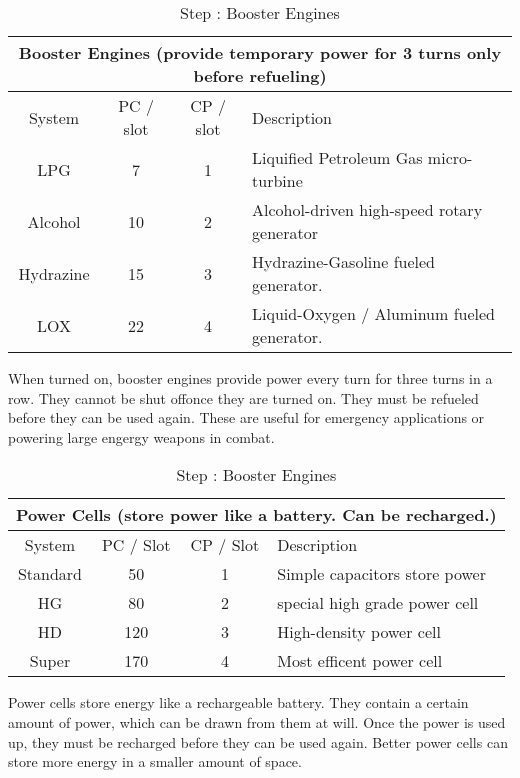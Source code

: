 \begin{table}[htb]
\begin{center}
\begin{tabular}{c|c|c|p{3.5in}}
\multicolumn{4}{c}{\textbf{Booster Engines (provide temporary power for 3 turns only before refueling)}} \\
\hline
\hline
System & PC / slot & CP / slot & Description \\ \hline
LPG & 7 & 1 & Liquified Petroleum Gas micro-turbine \\ \hline
Alcohol & 10 & 2 & Alcohol-driven high-speed rotary generator \\ \hline
Hydrazine & 15 & 3 & Hydrazine-Gasoline fueled generator. \\ \hline
LOX & 22 & 4 & Liquid-Oxygen / Aluminum fueled generator. \\ \hline
\end{tabular}
\caption{Step : Booster Engines}
\end{center}
\end{table}

When turned on, booster engines provide power every turn for three turns in a row.  They cannot be shut offonce they are turned on. They must be refueled before they can be used again.  These are useful for emergency applications or powering large engergy weapons in combat.

\begin{table}[htb]
\begin{center}
\begin{tabular}{c|c|c|p{3.5in}}
\multicolumn{4}{c}{\textbf{Power Cells (store power like a battery.  Can be recharged.)}} \\
\hline
\hline
System & PC / Slot & CP / Slot & Description \\ \hline
Standard & 50 & 1 & Simple capacitors store power \\ \hline
HG & 80 & 2 & special high grade power cell \\ \hline
HD & 120 & 3 & High-density power cell \\ \hline
Super & 170 & 4 & Most efficent power cell \\ \hline
\end{tabular}
\caption{Step : Booster Engines}
\end{center}
\end{table}

Power cells store energy like a rechargeable battery.  They contain a certain amount of power, which can be drawn from them at will.  Once the power is used up, they must be recharged before they can be used again.  Better power cells can store more energy in a smaller amount of space.

